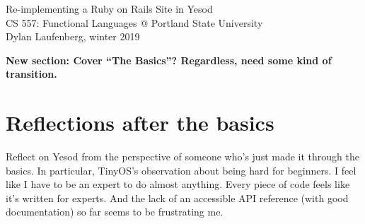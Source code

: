 \documentclass{article}
\newcommand {\todo}[1] {{\textbf{\color{red}#1}}}
\begin{document}
\begin{center}
    \Huge Re-implementing a Ruby on Rails Site in Yesod \\
    \large CS 557: Functional Languages @ Portland State University \\
    Dylan Laufenberg, winter 2019
\end{center}



\todo{New section: Cover ``The Basics''? Regardless, need some kind of transition.}





\section{Reflections after the basics}

Reflect on Yesod from the perspective of someone who's just made it through the basics. In particular, TinyOS's observation about being hard for beginners. I feel like I have to be an expert to do almost anything. Every piece of code feels like it's written for experts. And the lack of an accessible API reference (with good documentation) so far seems to be frustrating me.

% 
% 
% 
% 

\printbibliography
\end{document}
